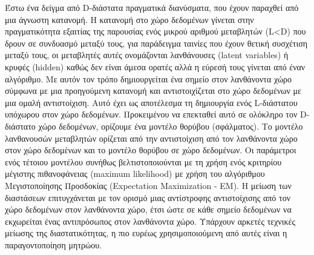 Έστω ένα δείγμα από D-διάστατα πραγματικά διανύσματα, που έχουν παραχθεί από μια άγνωστη κατανομή. Η κατανομή στο χώρο δεδομένων γίνεται στην πραγματικότητα εξαιτίας της παρουσίας ενός μικρού αριθμού μεταβλητών (L<D) που δρουν σε συνδυασμό μεταξύ τους, για παράδειγμα ταινίες που έχουν θετική συσχέτιση μεταξύ τους, οι μεταβλητές αυτές ονομάζονται λανθάνουσες (latent variables) ή κρυφές (hidden) καθώς δεν είναι άμεσα ορατές αλλά η εύρεσή τους γίνεται από έναν αλγόριθμο. Με αυτόν τον τρόπο δημιουργείται ένα σημείο στον λανθάνοντα χώρο σύμφωνα με μια προηγούμενη κατανομή και αντιστοιχίζεται στο χώρο δεδομένων με μια ομαλή αντιστοίχιση. Αυτό έχει ως αποτέλεσμα τη δημιουργία ενός L-διάστατου υπόχωρου στον χώρο δεδομένων. Προκειμένου να επεκταθεί αυτό σε ολόκληρο τον D-διάστατο χώρο δεδομένων, ορίζουμε ένα μοντέλο θορύβου (σφάλματος). Το μοντέλο λανθανουσών μεταβλητών ορίζεται από την αντιστοίχιση από τον λανθάνοντα χώρο στον χώρο δεδομένων και το μοντέλο θορύβου σε χώρο δεδομένων. Οι παράμετροι ενός τέτοιου μοντέλου συνήθως βελτιστοποιούνται με τη χρήση ενός κριτηρίου μέγιστης πιθανοφάνειας (maximum likelihood) με χρήση του αλγόριθμου Μεγιστοποίησης Προσδοκίας (Expectation Maximization - EM). Η μείωση των διαστάσεων επιτυγχάνεται με τον ορισμό μιας αντίστροφης αντιστοίχισης από τον χώρο δεδομένων στον λανθάνοντα χώρο, έτσι ώστε σε κάθε σημείο δεδομένων να εκχωρείται ένας αντιπρόσωπος στον λανθάνοντα χώρο.  Υπάρχουν αρκετές τεχνικές μείωσης της διαστατικότητας, η πιο ευρέως χρησιμοποιούμενη από αυτές είναι η παραγοντοποίηση μητρώου.

